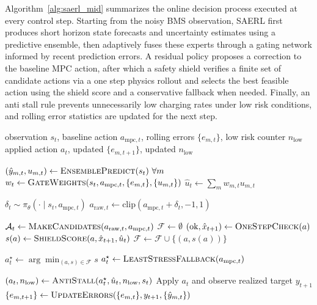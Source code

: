 \documentclass[%
 aip,
 amsmath,amssymb,
reprint, onecolumn %
]{revtex4-1}
\begin{document}
Algorithm~\ref{alg:saerl_mid} summarizes the online decision process executed at every control step. Starting from the noisy BMS observation, SAERL first produces short horizon state forecasts and uncertainty estimates using a predictive ensemble, then adaptively fuses these experts through a gating network informed by recent prediction errors. A residual policy proposes a correction to the baseline MPC action, after which a safety shield verifies a finite set of candidate actions via a one step physics rollout and selects the best feasible action using the shield score and a conservative fallback when needed. Finally, an anti stall rule prevents unnecessarily low charging rates under low risk conditions, and rolling error statistics are updated for the next step.


\begin{algorithm}[t]
\caption{SAERL online control loop}
\label{alg:saerl_mid}
\begin{algorithmic}[1]
\Require observation $s_t$, baseline action $a_{\mathrm{mpc},t}$, rolling errors $\{e_{m,t}\}$, low risk counter $n_{\mathrm{low}}$
\Ensure applied action $a_t$, updated $\{e_{m,t+1}\}$, updated $n_{\mathrm{low}}$

\State $(\hat y_{m,t},u_{m,t}) \gets \textsc{EnsemblePredict}(s_t)\ \forall m$
\State $w_t \gets \textsc{GateWeights}(s_t,a_{\mathrm{mpc},t},\{e_{m,t}\},\{u_{m,t}\})$
\State $\hat u_t \gets \sum_m w_{m,t}u_{m,t}$

\State $\delta_t \sim \pi_\theta(\cdot\mid s_t,a_{\mathrm{mpc},t})$
\State $a_{\mathrm{raw},t} \gets \mathrm{clip}(a_{\mathrm{mpc},t}+\delta_t,-1,1)$

\State $\mathcal{A}_t \gets \textsc{MakeCandidates}(a_{\mathrm{raw},t},a_{\mathrm{mpc},t})$
\State $\mathcal{F} \gets \emptyset$
    \State $(\mathrm{ok},\hat x_{t+1}) \gets \textsc{OneStepCheck}(a)$
        \State $s(a) \gets \textsc{ShieldScore}(a,\hat x_{t+1},\hat u_t)$
        \State $\mathcal{F} \gets \mathcal{F} \cup \{(a,s(a))\}$
    \EndIf
\EndFor

    \State $a^\star_t \gets \arg\min_{(a,s)\in\mathcal{F}} s$
\Else
    \State $a^\star_t \gets \textsc{LeastStressFallback}(a_{\mathrm{mpc},t})$
\EndIf

\State $(a_t,n_{\mathrm{low}}) \gets \textsc{AntiStall}(a^\star_t,\hat u_t,n_{\mathrm{low}},s_t)$
\State Apply $a_t$ and observe realized target $y_{t+1}$
\State $\{e_{m,t+1}\} \gets \textsc{UpdateErrors}(\{e_{m,t}\},y_{t+1},\{\hat y_{m,t}\})$

\end{algorithmic}
\end{algorithm}
\end{document}
